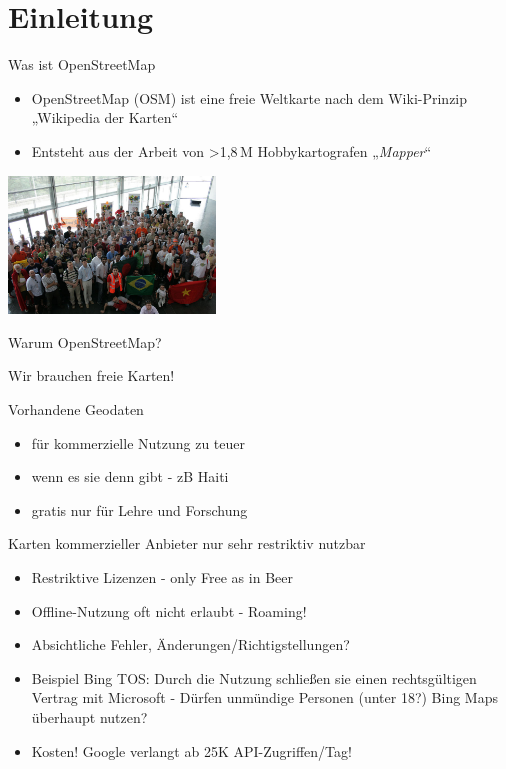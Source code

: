 \documentclass{beamer}
\begin{document}
\section{Einleitung}

\begin{frame}{Was ist OpenStreetMap}

\begin{itemize}
  \item OpenStreetMap (OSM) ist eine freie Weltkarte nach dem Wiki-Prinzip „Wikipedia der Karten“
\pause
  \item Entsteht aus der Arbeit von \textgreater 1,8\,M Hobbykartografen „\emph{Mapper}“
\end{itemize}

 \begin{center}
 \includegraphics[width=5.5cm]{sotm.jpg}
 \end{center}

\end{frame}


\begin{frame}{Warum OpenStreetMap?}

Wir brauchen freie Karten!

\pause
\vspace{2mm}
Vorhandene Geodaten 
\begin{itemize}
  \item	für kommerzielle Nutzung zu teuer
  \item	wenn es sie denn gibt - zB Haiti
  \item	gratis nur für Lehre und Forschung
\end{itemize}

\pause
\vspace{2mm}
Karten kommerzieller Anbieter nur sehr restriktiv nutzbar
\begin{itemize}
  \item Restriktive Lizenzen - only Free as in Beer
  \item Offline-Nutzung oft nicht erlaubt - Roaming!
  \item Absichtliche Fehler, Änderungen/Richtigstellungen?
  \pause
  \item Beispiel Bing TOS: Durch die Nutzung schließen sie einen rechtsgültigen Vertrag mit Microsoft - Dürfen unmündige Personen (unter 18?) Bing Maps überhaupt nutzen?
  \item Kosten! Google verlangt ab 25K API-Zugriffen/Tag!
\end{itemize}

\end{frame}
\end{document}
